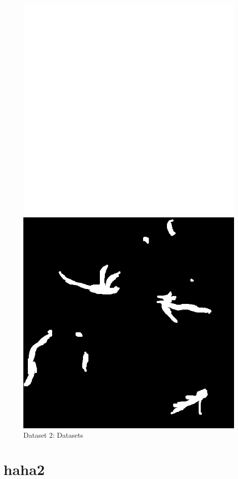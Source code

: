 \begin{figure}[ht!]
    \begin{minipage}[t]{\linewidth}
        \begin{minipage}[t]{0.49\linewidth}
            \includegraphics[width=\textwidth, keepaspectratio]{./graphics/dataset_sample_2.png}  %
        \end{minipage}
        \begin{minipage}[t]{0.49\linewidth}
            \includegraphics[width=\textwidth, keepaspectratio]{./graphics/dataset_sample_2_label.png}  %
        \end{minipage}
    \end{minipage}
    \label{fig:1}
    \caption{Dataset 2: Datasets }
\end{figure}


\section{haha2}


